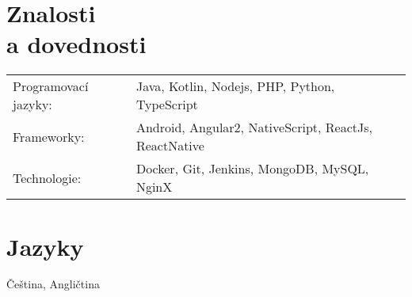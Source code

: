 \documentclass[margin]{res}
\begin{document}
\begin{resume}
\section{Znalosti \\ a dovednosti}
   \begin{tabular}{l p{3in}}
    Programovací jazyky: & Java, Kotlin, Nodejs, PHP, Python, TypeScript \\
    Frameworky: & Android, Angular2, NativeScript, ReactJs, ReactNative \\
    Technologie: &  Docker, Git, Jenkins, MongoDB, MySQL, NginX
   \end{tabular}

\section{Jazyky}
Čeština, Angličtina

\end{resume} 
\end{document}
